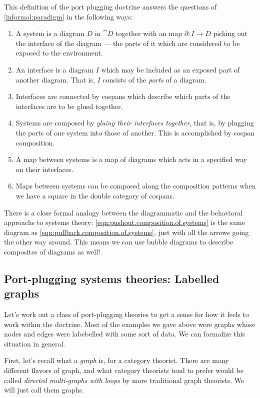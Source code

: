 \documentclass[DynamicalBook]{subfiles}
\begin{document}
  This definition of the port plugging doctrine answers the questions of \cref{informal:paradigm} in the following ways:
  \begin{enumerate}
          \item A system is a diagram $D$ in $\cat{D}$ together with an map $\partial : I \to D$ picking out the interface of the diagram --- the parts of it which are considered to be exposed to the environment.
          \item An interface is a diagram $I$ which may be included as an exposed part of another diagram. That is, $I$ consists of the \emph{ports} of a diagram.
          \item Interfaces are connected by cospans which describe which parts of the interfaces are to be glued together.
          \item Systems are composed by \emph{gluing their interfaces together}, that is, by plugging the ports of one system into those of another. This is accomplished by cospan composition.
          \item A map between systems is a map of diagrams which acts in a specified way on their interfaces.
          \item Maps between systems can be composed along the composition patterns when we have a square in the double category of cospans.
  \end{enumerate}

There is a close formal analogy between the diagrammatic and the behavioral approachs to systems theory: \cref{eqn:pushout.composition.of.systems} is the same diagram as \cref{eqn:pullback.composition.of.systems}, just with all the arrows going the other way around. This means we can use bubble diagrams to describe composites of diagrams as well!

\subsection{Port-plugging systems theories: Labelled graphs}

Let's work out a class of port-plugging theories to get a sense for how it feels to work within the doctrine. Most of the examples we gave above were graphs whose nodes and edges were labebelled with some sort of data. We can formalize this situation in general.

First, let's recall what a \emph{graph} is, for a category theorist. There are many different flavors of graph, and what category theorists tend to prefer would be called \emph{directed multi-graphs with loops} by more traditional graph theorists. We will just call them graphs.
\end{document}
